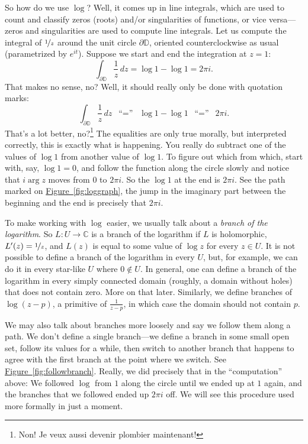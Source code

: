 \documentclass[12pt,openany]{book}
\newcommand{\C}{{\mathbb{C}}}
\newcommand{\D}{{\mathbb{D}}}
\newcommand{\myindex}[1]{#1\index{#1}}
\newcommand{\myquote}[1]{``#1''}
\theoremstyle{plain}
\theoremstyle{remark}
\theoremstyle{definition}
\theoremstyle{exercise}
\theoremstyle{example}
\newcommand{\figureref}[1]{\hyperref[#1]{Figure~\ref*{#1}}}
\begin{document}
So how do we use $\log$?  Well, it comes up in line integrals, which are used
to count and classify zeros (roots) and/or singularities of functions, or vice
versa---zeros and singularities are used to compute line integrals.
Let us compute the integral of $\nicefrac{1}{z}$ around the unit
circle $\partial \D$, oriented counterclockwise as usual (parametrized
by $e^{it}$).  Suppose we start and end the integration at 
$z=1$:
\begin{equation*}
\int_{\partial \D} \frac{1}{z} \, dz
= \log 1 - \log 1 = 2\pi i.
\end{equation*}
That makes no sense, no?  Well, it should really only be done
with quotation marks:
\begin{equation*}
\int_{\partial \D} \frac{1}{z} \, dz
\enspace
\text{``$=$''}
\enspace
\log 1 - \log 1
\enspace
\text{``$=$''}
\enspace
2\pi i.
\end{equation*}
That's a lot better,
no?\footnote{Non! Je veux aussi devenir plombier maintenant!}
The equalities are only true morally,
but interpreted correctly, this is exactly what is happening.
You really do subtract
one of the values of $\log 1$ from another value of $\log 1$.  To figure
out which from which, start with, say, $\log 1 = 0$, and follow the
function along the circle slowly and notice that $i \arg z$ moves from $0$ to
$2\pi i$.  So the $\log 1$ at the end is $2 \pi i$.  See the path
marked on \figureref{fig:loggraph}, the jump in the imaginary part between
the beginning and the end is precisely that $2\pi i$.

To make working with $\log$ easier, we usually talk about a
\emph{\myindex{branch of the logarithm}}.  So $L \colon U \to \C$ is a branch
of the logarithm if $L$ is holomorphic, $L'(z) = \nicefrac{1}{z}$, and $L(z)$ is equal
to some value of $\log z$ for every $z \in U$.  It is not possible to define
a branch of the logarithm in every $U$, but, for example, we can do it in every
star-like $U$ where $0 \notin U$.  In general, one can define a branch of
the logarithm in every simply connected domain
(roughly, a domain without holes)
that does not contain zero.
More on that later.  Similarly, we define branches of $\log (z-p)$,
a primitive of $\frac{1}{z-p}$, in which case the domain
should not contain $p$.

We may also talk about branches more loosely and say
we follow them along a path.  We don't define
a single branch---we define a branch in some small open set,
follow its values for a while, then switch to another branch that 
happens to agree with the first branch at the point where we
switch.  See \figureref{fig:followbranch}.  Really, we did precisely that in the
\myquote{computation} above:  We followed $\log$ from $1$ along the circle until we
ended up at $1$ again, and the branches that we followed ended up $2\pi i$
off.  We will see this procedure used more formally in just a moment.
\end{document}
